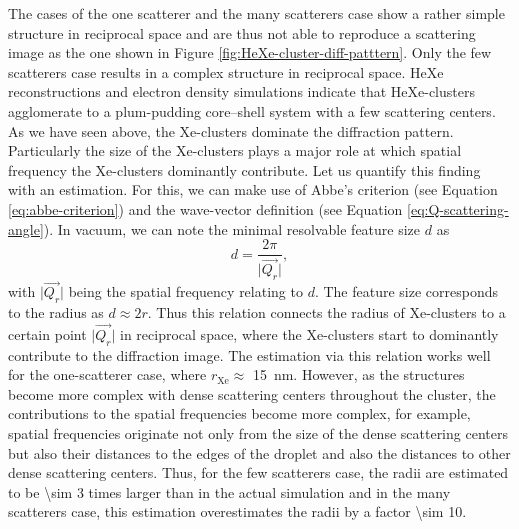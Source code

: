 %
The cases of the one scatterer and the many scatterers case show a rather simple structure in reciprocal space and are thus not able to reproduce a scattering image as the one shown in Figure \ref{fig:HeXe-cluster-diff-patttern}. Only the few scatterers case results in a complex structure in reciprocal space. HeXe reconstructions and electron density simulations indicate that HeXe-clusters agglomerate to a plum-pudding core--shell system with a few scattering centers.\\[1\baselineskip]
%
%
As we have seen above, the Xe-clusters dominate the diffraction pattern. Particularly the size of the Xe-clusters plays a major role at which spatial frequency the Xe-clusters dominantly contribute. Let us quantify this finding with an estimation.
For this, we can make use of Abbe's criterion (see Equation \eqref{eq:abbe-criterion}) and the wave-vector definition (see Equation \eqref{eq:Q-scattering-angle}). In vacuum, we can note the minimal resolvable feature size $d$ as
\begin{equation}
d = \frac{2\pi}{\lvert\vec{Q_{r}}\rvert},
\label{eq:diameter-estimate}
\end{equation}
with $\lvert\vec{Q_{r}}\rvert$ being the spatial frequency relating to $d$. The feature size corresponds to the radius as $d\approx 2 r$. Thus this relation connects the radius of Xe-clusters to a certain point $\lvert\vec{Q_{r}}\rvert$ in reciprocal space, where the Xe-clusters start to dominantly contribute to the diffraction image. The estimation via this relation works well for the one-scatterer case, where $r_{\text{Xe}}\approx$ \SI{15}{\nano\meter}. However, as the structures become more complex with dense scattering centers throughout the cluster, the contributions to the spatial frequencies become more complex, for example, spatial frequencies originate not only from the size of the dense scattering centers but also their distances to the edges of the droplet and also the distances to other dense scattering centers. Thus, for the few scatterers case, the radii are estimated to be \num{\sim 3} times larger than in the actual simulation and in the many scatterers case, this estimation overestimates the radii by a factor \num{\sim 10}.\\[1\baselineskip]
